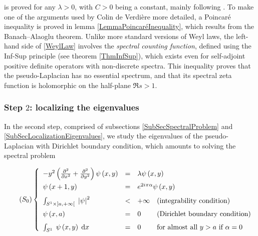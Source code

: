 \documentclass{jams-l}
\theoremstyle{definition}
\theoremstyle{remark}
\numberwithin{equation}{section}
\begin{document}
                \noindent is proved for any $\lambda > 0$, with $C > 0$ being a constant, mainly following \cite{MR699488}. To make one of the arguments used by Colin de Verdière more detailed, a Poincaré inequality is proved in lemma \ref{LemmaPoincaréInequality}, which results from the Banach--Alaoglu theorem. Unlike more standard versions of Weyl laws, the left-hand side of \eqref{WeylLaw} involves the \textit{spectral counting function}, defined using the Inf-Sup principle (see theorem \ref{ThmInfSup}), which exists even for self-adjoint positive definite operators with non-discrete spectra. This inequality proves that the pseudo-Laplacian has no essential spectrum, and that its spectral zeta function is holomorphic on the half-plane $\Re s > 1$.
                
        
        \subsubsection{Step $2$: localizing the eigenvalues}
        
            In the second step, comprised of subsections \ref{SubSecSpectralProblem} and \ref{SubSecLocalizationEigenvalues}, we study the eigenvalues of the pseudo-Laplacian with Dirichlet boundary condition, which amounts to solving the spectral problem
            
            \begin{equation}
            \tag{$S_0$}
            \label{SystPsi}
                \left \{ \begin{array}{llll}
                    - y^2 \left( \frac{\partial^2}{\partial x^2} + \frac{\partial^2}{\partial y^2} \right) \psi \left( x, y \right) & = & \multicolumn{2}{l}{\lambda \psi \left( x, y \right)} \\[0.7em]
                
                    \psi \left( x+1, y \right) & = & \multicolumn{2}{l}{e^{2 i \pi \alpha} \psi \left( x, y \right)} \\[0.7em]
                
                    \int_{S^1 \times \left] a, +\infty \right[} \; \left \vert \psi \right \vert^2 & < & + \infty & \text{(integrability condition)} \\[0.7em]
                
                    \psi \left( x, a \right) & = & 0 & \text{(Dirichlet boundary condition)} \\[0.7em]
                
                    \int_{S^1} \; \psi \left( x, y \right) \; \mathrm{d}x & = & 0 &  \text{for almost all } y > a \text{ if } \alpha = 0
                \end{array} \right.
            \end{equation}
            
\end{document}
